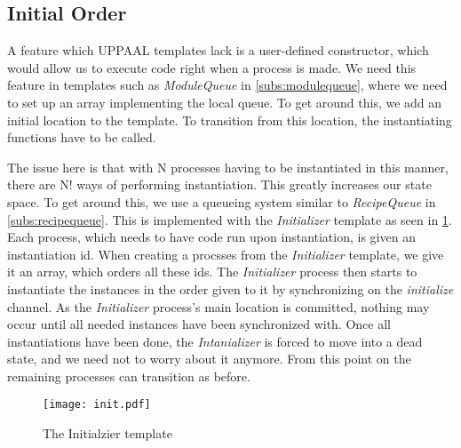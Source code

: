 

\subsection{Initial Order}
A feature which UPPAAL templates lack is a user-defined constructor, which would allow us to execute code right when a process is made. We need this feature in templates such as \emph{ModuleQueue} in \cref{subs:modulequeue}, where we need to set up an array implementing the local queue. To get around this, we add an initial location to the template. To transition from this location, the instantiating functions have to be called.

The issue here is that with N processes having to be instantiated in this manner, there are N! ways of performing instantiation. This greatly increases our state space. To get around this, we use a queueing system similar to \emph{RecipeQueue} in \cref{subs:recipequeue}. This is implemented with the \emph{Initializer} template as seen in \cref{fig:initializer}. Each process, which needs to have code run upon instantiation, is given an instantiation id. When creating a procsses from the \emph{Initializer} template, we give it an array, which orders all these ids. The \emph{Initializer} process then starts to instantiate the instances in the order given to it by synchronizing on the \emph{initialize} channel. As the \emph{Initializer} process's main location is committed, nothing may occur until all needed instances have been synchronized with. Once all instantiations have been done, the \emph{Intanializer} is forced to move into a dead state, and we need not to worry about it anymore. From this point on the remaining  processes can transition as before. 

\begin{figure}[h]
\centering
\texttt{[image: init.pdf]}
\caption{The Initialzier template}
\label{fig:initializer}
\end{figure}

